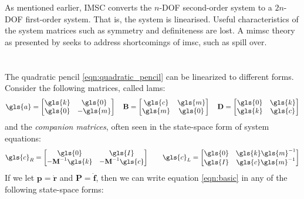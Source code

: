 As mentioned earlier, IMSC converts the $n$-DOF second-order system to a $2n$-DOF
first-order system. That is, the system is linearised. Useful characteristics of 
the system matrices such as symmetry and definiteness are lost. A \gls{mimsc} 
theory as presented by \citet{Fang2003421} seeks to address shortcomings of 
\gls{imsc}, such as spill over.

\section{}
\label{sec:SPT}
The quadratic pencil \eqref{eqn:quadratic_pencil} can be linearized to different forms.
Consider the following matrices, called \glspl{lam}:
\begin{equation}
	\label{eqn:lam}
	\gls{a} = \begin{bmatrix}
	\gls{k} & \gls{0}\\
	\gls{0} & -\gls{m}
	\end{bmatrix} 
	\quad\mathbf{B} = \begin{bmatrix}
	\gls{c} & \gls{m}\\
	\gls{m} & \gls{0}
	\end{bmatrix}  
	\quad\mathbf{D} = \begin{bmatrix}
	\gls{0} & \gls{k}\\
	\gls{k} & \gls{c}
	\end{bmatrix}
\end{equation}
and the \emph{companion matrices}, often seen in the state-space form of system equations:
\begin{equation}
	\gls{c}_R = \begin{bmatrix}
	\gls{0} & \gls{I}\\
	\mathbf{-M}^{-1}\gls{k} & \mathbf{-M}^{-1}\gls{c}
	\end{bmatrix} 
	\qquad \gls{c}_L = \begin{bmatrix}
	\gls{0} & \gls{k}\gls{m}^{-1}\\
	\gls{I} & \gls{c}\gls{m}^{-1}
	\end{bmatrix}
\end{equation}
If we let $\mathbf{p} = \mathbf{\dot{r}}$ and $\mathbf{P} = \mathbf{\dot{f}}$, 
then we can write equation \eqref{eqn:basic} in any of the following state-space 
forms:
